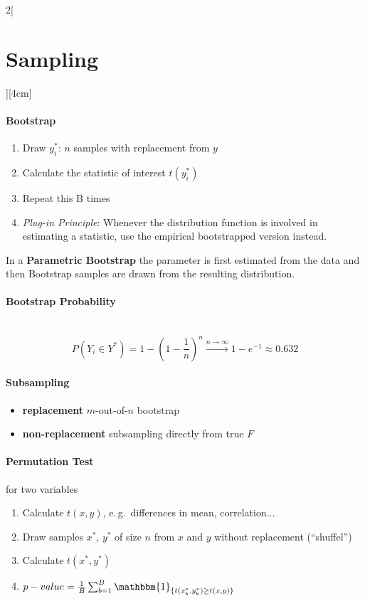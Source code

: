 \documentclass[8pt]{extarticle}
\begin{document}
\begin{multicols}{2}[\section{Sampling}][4cm]

\paragraph{Bootstrap}

\begin{enumerate}
\item Draw $y^*_i$: $n$ samples with replacement from $y$
\item Calculate the statistic of interest $t(y_i^*)$
\item Repeat this B times
\item \noindent \textit{Plug-in Principle}:
Whenever the distribution function is involved in estimating a statistic, use the empirical bootstrapped version instead.
\end{enumerate}

\noindent In a \textbf{Parametric Bootstrap} the parameter is first estimated from the data and then Bootstrap samples are drawn from the resulting distribution.

\paragraph{Bootstrap Probability} \ \\

$$P(Y_i\in Y^*) = 1-(1-\frac{1}{n})^n\overset{n\rightarrow\infty}{\rightarrow} 1-e^{-1} \approx 0.632$$


\paragraph{Subsampling}

\begin{itemize}
\item \textbf{replacement} $m$-out-of-$n$ bootstrap
\item \textbf{non-replacement} subsampling directly from true $F$
\end{itemize}

\paragraph{Permutation Test} for two variables

\begin{enumerate}
\item Calculate $t(x,y)$, e.\,g.\ differences in mean, correlation...
\item Draw samples $x^*$, $y^*$ of size $n$ from $x$ and $y$ without replacement (``shuffel'')\label{draw}
\item Calculate $t(x^*, y^*)$ 
\item $p-value = \frac{1}{B}\sum_{b=1}^B \mathbbm{1}_{\{t(x_b^*,y_b^*)\geq t(x,y)\}}$
\end{enumerate}


\end{multicols}
\end{document}
